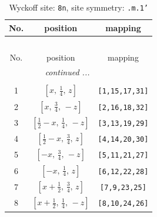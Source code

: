 \documentclass[fleqn,8pt]{jsarticle}
\begin{document}
\begin{longtable}{ccc}
\caption{Wyckoff site: {\tt 8n}, site symmetry: {\tt .m.1'}}
 \\
 \hline \hline
No. & position & mapping \\ \hline \endfirsthead

\multicolumn{2}{l}{\tablename\ \thetable{}} \\
 \hline \hline
No. & position & mapping \\ \hline \endhead

 \hline \hline
\multicolumn{2}{r}{\footnotesize\it continued ...} \\ \endfoot

 \hline \hline
\multicolumn{2}{r}{} \\ \endlastfoot

1 & $\left[ x,\, \frac{1}{4},\, z \right]$ & {\tt [1,15,17,31]} \\ \hline
2 & $\left[ x,\, \frac{3}{4},\, - z \right]$ & {\tt [2,16,18,32]} \\ \hline
3 & $\left[ \frac{1}{2} - x,\, \frac{1}{4},\, - z \right]$ & {\tt [3,13,19,29]} \\ \hline
4 & $\left[ \frac{1}{2} - x,\, \frac{3}{4},\, z \right]$ & {\tt [4,14,20,30]} \\ \hline
5 & $\left[ - x,\, \frac{3}{4},\, - z \right]$ & {\tt [5,11,21,27]} \\ \hline
6 & $\left[ - x,\, \frac{1}{4},\, z \right]$ & {\tt [6,12,22,28]} \\ \hline
7 & $\left[ x + \frac{1}{2},\, \frac{3}{4},\, z \right]$ & {\tt [7,9,23,25]} \\ \hline
8 & $\left[ x + \frac{1}{2},\, \frac{1}{4},\, - z \right]$ & {\tt [8,10,24,26]} \\
\end{longtable}
\renewcommand{\arraystretch}{1.2}
\end{document}
